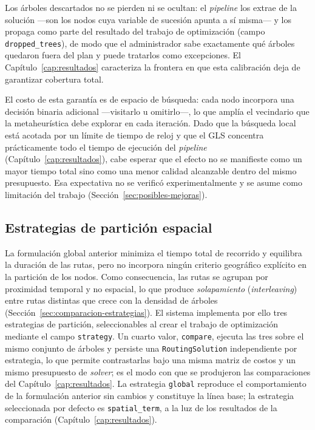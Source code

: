 Los árboles descartados no se pierden ni se ocultan: el \textit{pipeline} los extrae
de la solución ---son los nodos cuya variable de sucesión apunta a sí misma--- y los
propaga como parte del resultado del trabajo de optimización (campo
\texttt{dropped\_trees}), de modo que el administrador sabe exactamente qué árboles
quedaron fuera del plan y puede tratarlos como excepciones. El Capítulo~\ref{cap:resultados}
caracteriza la frontera en que esta calibración deja de garantizar cobertura total.

El costo de esta garantía es de espacio de búsqueda: cada nodo incorpora una
decisión binaria adicional ---visitarlo u omitirlo---, lo que amplía el vecindario
que la metaheurística debe explorar en cada iteración. Dado que la búsqueda local
está acotada por un límite de tiempo de reloj y que el GLS concentra prácticamente
todo el tiempo de ejecución del \textit{pipeline}
(Capítulo~\ref{cap:resultados}), cabe esperar que el efecto no se manifieste como un
mayor tiempo total sino como una menor calidad alcanzable dentro del mismo
presupuesto. Esa expectativa no se verificó experimentalmente y se asume como
limitación del trabajo (Sección~\ref{sec:posibles-mejoras}).

\subsection{Estrategias de partición espacial}
\label{sec:estrategias}

La formulación global anterior minimiza el tiempo total de recorrido y equilibra
la duración de las rutas, pero no incorpora ningún criterio geográfico explícito
en la partición de los nodos. Como consecuencia, las rutas se agrupan por
proximidad temporal y no espacial, lo que produce \textit{solapamiento}
(\textit{interleaving}) entre rutas distintas que crece con la densidad de árboles
(Sección~\ref{sec:comparacion-estrategias}). El sistema implementa por ello tres estrategias de
partición, seleccionables al crear el trabajo de optimización mediante el campo
\texttt{strategy}. Un cuarto valor, \texttt{compare}, ejecuta las tres sobre el mismo
conjunto de árboles y persiste una \texttt{RoutingSolution} independiente por
estrategia, lo que permite contrastarlas bajo una misma matriz de costos y un mismo
presupuesto de \textit{solver}; es el modo con que se produjeron las comparaciones del
Capítulo~\ref{cap:resultados}. La estrategia \texttt{global} reproduce el
comportamiento de la formulación anterior sin cambios y constituye la línea base;
la estrategia seleccionada por defecto es \texttt{spatial\_term}, a la luz de los
resultados de la comparación (Capítulo~\ref{cap:resultados}).

